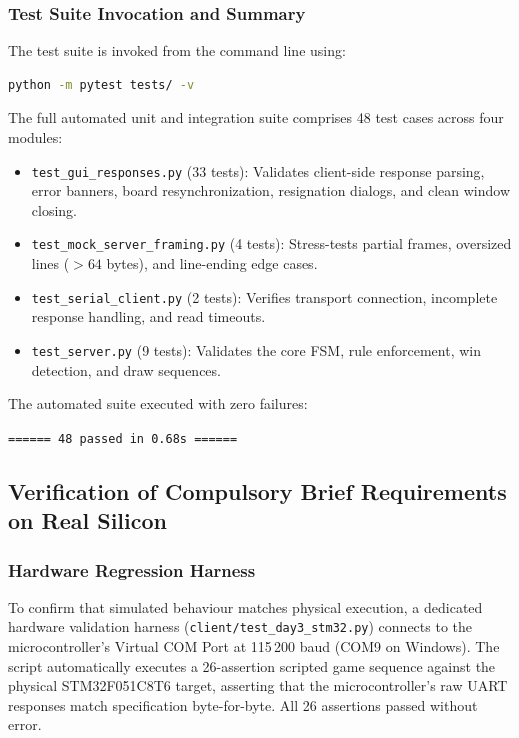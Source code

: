 \subsubsection{Test Suite Invocation and Summary}
The test suite is invoked from the command line using:
\begin{lstlisting}[language=bash]
python -m pytest tests/ -v
\end{lstlisting}
The full automated unit and integration suite comprises 48 test cases across four modules:
\begin{itemize}
    \item \texttt{test\_gui\_responses.py} (33 tests): Validates client-side response parsing, error banners, board resynchronization, resignation dialogs, and clean window closing.
    \item \texttt{test\_mock\_server\_framing.py} (4 tests): Stress-tests partial frames, oversized lines ($>64$ bytes), and line-ending edge cases.
    \item \texttt{test\_serial\_client.py} (2 tests): Verifies transport connection, incomplete response handling, and read timeouts.
    \item \texttt{test\_server.py} (9 tests): Validates the core FSM, rule enforcement, win detection, and draw sequences.
\end{itemize}
The automated suite executed with zero failures:
\begin{center}
\footnotesize
\texttt{====== 48 passed in 0.68s ======}
\end{center}

\subsection{Verification of Compulsory Brief Requirements on Real Silicon}

\subsubsection{Hardware Regression Harness}
To confirm that simulated behaviour matches physical execution, a dedicated hardware validation harness (\texttt{client/test\_day3\_stm32.py}) connects to the microcontroller's Virtual COM Port at 115\,200 baud (COM9 on Windows).
The script automatically executes a 26-assertion scripted game sequence against the physical STM32F051C8T6 target, asserting that the microcontroller's raw UART responses match specification byte-for-byte.
All 26 assertions passed without error.

